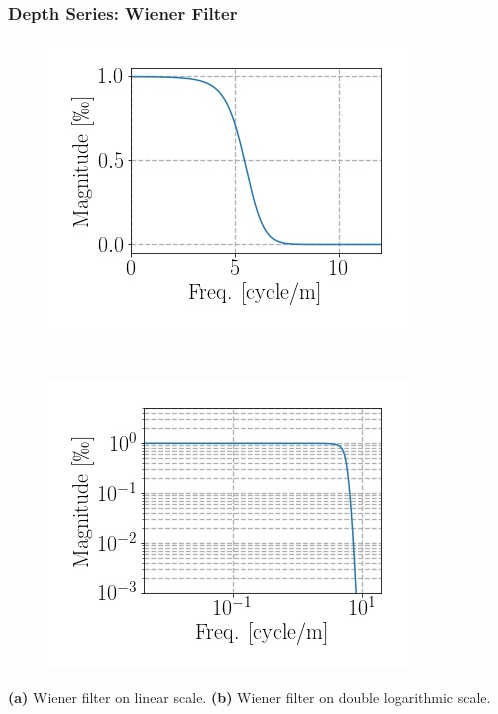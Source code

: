 \documentclass[../../CompleteThesis/Complete_1stDraft.tex]{subfiles}
\begin{document}
\subsubsection[Wiener Filter]{Depth Series: Wiener Filter}
\label{Subsubsec:Method_FirstSigmaEstimate_BackDiffusion_WienerFilter}

\begin{marginfigure}
	\centering
	\begin{subfigure}{\marginparwidth}
		\centering
		\includegraphics[width=\textwidth]{SiteA_WienerFilter.jpg}
		\caption{\footnotesize}
		\label{fig:SiteA_WienerFilter}
	\end{subfigure}\\[1ex]
	
	\begin{subfigure}{\marginparwidth}
		\centering
		\includegraphics[width=\textwidth]{SiteA_WienerFilter_loglog.jpg}
		\caption{\footnotesize}
		\label{fig:SiteA_WienerFilter_loglog}
	\end{subfigure}
	\caption[Wiener filter]{\footnotesize\textbf{(a)} Wiener filter on linear scale. \textbf{(b)} Wiener filter on double logarithmic scale.}
	\label{fig:SiteA_WienerFilters}
\end{marginfigure}
\end{document}
